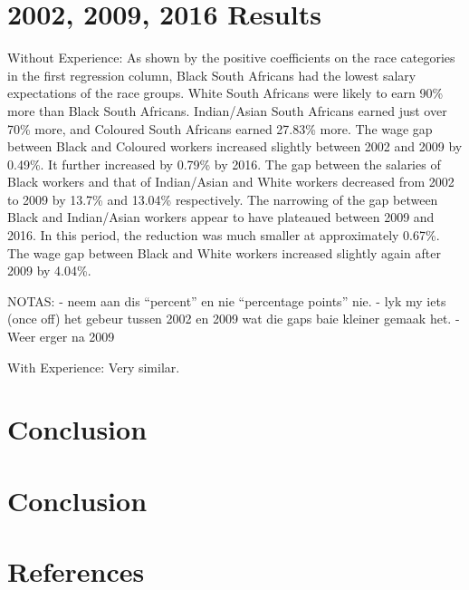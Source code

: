 \documentclass[11pt,preprint, authoryear]{elsarticle}
\numberwithin{equation}{section}
\numberwithin{figure}{section}
\numberwithin{table}{section}
\newlength{\cslhangindent}
\newenvironment{CSLReferences}%
  {\setlength{\parindent}{0pt}%
  \everypar{\setlength{\hangindent}{\cslhangindent}}\ignorespaces}%
  {\par}
\begin{document}
\hypertarget{results-1}{%
\section{2002, 2009, 2016 Results}\label{results-1}}

Without Experience: As shown by the positive coefficients on the race
categories in the first regression column, Black South Africans had the
lowest salary expectations of the race groups. White South Africans were
likely to earn 90\% more than Black South Africans. Indian/Asian South
Africans earned just over 70\% more, and Coloured South Africans earned
27.83\% more. The wage gap between Black and Coloured workers increased
slightly between 2002 and 2009 by 0.49\%. It further increased by 0.79\%
by 2016. The gap between the salaries of Black workers and that of
Indian/Asian and White workers decreased from 2002 to 2009 by 13.7\% and
13.04\% respectively. The narrowing of the gap between Black and
Indian/Asian workers appear to have plateaued between 2009 and 2016. In
this period, the reduction was much smaller at approximately 0.67\%. The
wage gap between Black and White workers increased slightly again after
2009 by 4.04\%.

NOTAS: - neem aan dis ``percent'' en nie ``percentage points'' nie. -
lyk my iets (once off) het gebeur tussen 2002 en 2009 wat die gaps baie
kleiner gemaak het. - Weer erger na 2009

With Experience: Very similar.

\hypertarget{conclusion}{%
\section{Conclusion}\label{conclusion}}

\hfill

\hypertarget{conclusion-1}{%
\section{Conclusion}\label{conclusion-1}}

\newpage

\hypertarget{references}{%
\section*{References}\label{references}}

\hypertarget{refs}{}
\begin{CSLReferences}{0}{0}
\end{CSLReferences}
\end{document}
